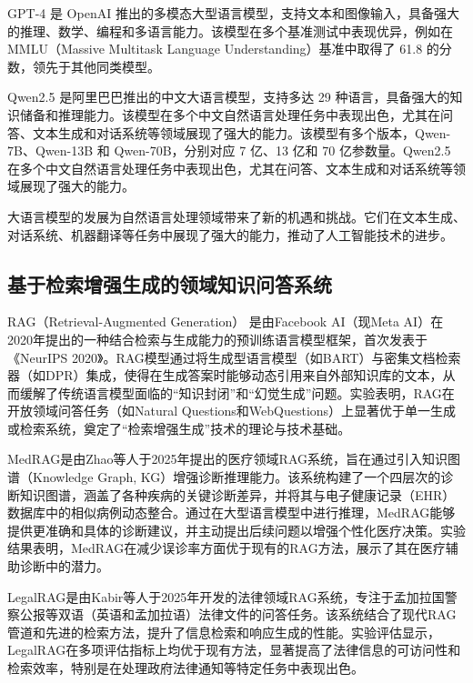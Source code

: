 \documentclass[12pt, a4paper]{ctexart}
\begin{document}
GPT-4 是 OpenAI 推出的多模态大型语言模型，支持文本和图像输入，具备强大的推理、数学、编程和多语言能力\cite{openai2024gpt4technicalreport}。该模型在多个基准测试中表现优异，例如在 MMLU（Massive Multitask Language Understanding）基准中取得了 61.8 的分数，领先于其他同类模型。

Qwen2.5 是阿里巴巴推出的中文大语言模型，支持多达 29 种语言，具备强大的知识储备和推理能力\cite{qwen2025qwen25technicalreport}。该模型在多个中文自然语言处理任务中表现出色，尤其在问答、文本生成和对话系统等领域展现了强大的能力。该模型有多个版本，Qwen-7B、Qwen-13B 和 Qwen-70B，分别对应 7 亿、13 亿和 70 亿参数量。Qwen2.5 在多个中文自然语言处理任务中表现出色，尤其在问答、文本生成和对话系统等领域展现了强大的能力。

大语言模型的发展为自然语言处理领域带来了新的机遇和挑战。它们在文本生成、对话系统、机器翻译等任务中展现了强大的能力，推动了人工智能技术的进步。

\subsection{基于检索增强生成的领域知识问答系统}
RAG（Retrieval-Augmented Generation） 是由Facebook AI（现Meta AI）在2020年提出的一种结合检索与生成能力的预训练语言模型框架，首次发表于《NeurIPS 2020》。RAG模型通过将生成型语言模型（如BART）与密集文档检索器（如DPR）集成，使得在生成答案时能够动态引用来自外部知识库的文本，从而缓解了传统语言模型面临的“知识封闭”和“幻觉生成”问题。实验表明，RAG在开放领域问答任务（如Natural Questions和WebQuestions）上显著优于单一生成或检索系统，奠定了“检索增强生成”技术的理论与技术基础。

MedRAG是由Zhao等人于2025年提出的医疗领域RAG系统，旨在通过引入知识图谱（Knowledge Graph, KG）增强诊断推理能力\cite{zhao2025medragenhancingretrievalaugmentedgeneration}。该系统构建了一个四层次的诊断知识图谱，涵盖了各种疾病的关键诊断差异，并将其与电子健康记录（EHR）数据库中的相似病例动态整合。通过在大型语言模型中进行推理，MedRAG能够提供更准确和具体的诊断建议，并主动提出后续问题以增强个性化医疗决策。实验结果表明，MedRAG在减少误诊率方面优于现有的RAG方法，展示了其在医疗辅助诊断中的潜力。

LegalRAG是由Kabir等人于2025年开发的法律领域RAG系统，专注于孟加拉国警察公报等双语（英语和孟加拉语）法律文件的问答任务\cite{kabir2025legalraghybridragmultilingual}。该系统结合了现代RAG管道和先进的检索方法，提升了信息检索和响应生成的性能。实验评估显示，LegalRAG在多项评估指标上均优于现有方法，显著提高了法律信息的可访问性和检索效率，特别是在处理政府法律通知等特定任务中表现出色。 
\end{document}
